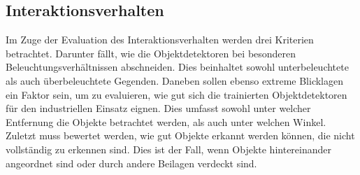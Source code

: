\subsection*{Interaktionsverhalten}

Im Zuge der Evaluation des Interaktionsverhalten werden drei Kriterien betrachtet. Darunter fällt, wie die Objektdetektoren bei besonderen Beleuchtungsverhältnissen abschneiden. Dies beinhaltet sowohl unterbeleuchtete als auch überbeleuchtete Gegenden. Daneben sollen ebenso extreme Blicklagen ein Faktor sein, um zu evaluieren, wie gut sich die trainierten Objektdetektoren für den industriellen Einsatz eignen. Dies umfasst sowohl unter welcher Entfernung die Objekte betrachtet werden, als auch unter welchen Winkel. Zuletzt muss bewertet werden, wie gut Objekte erkannt werden können, die nicht vollständig zu erkennen sind. Dies ist der Fall, wenn Objekte hintereinander angeordnet sind oder durch andere Beilagen verdeckt sind. 
